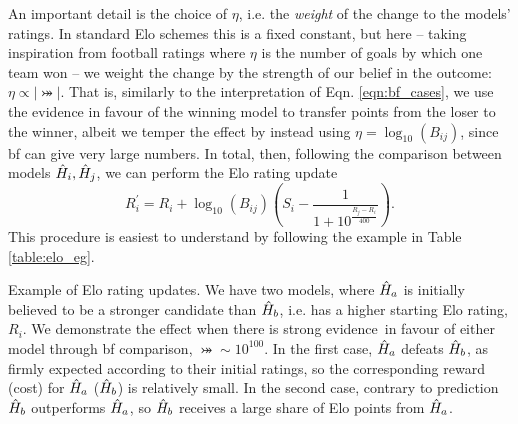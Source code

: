 An important detail is the choice of $\eta$, i.e. the \emph{weight} of the 
    change to the models' ratings. 
In standard Elo schemes this is a fixed constant, 
    but here -- taking inspiration from football ratings where $\eta$ is the number of goals 
    by which one team won -- we weight the change by the strength of our belief in the outcome: 
    $\eta \propto \lvert \bij \rvert$.
That is, similarly to the interpretation of Eqn. \ref{eqn:bf_cases}, 
    we use the evidence in favour of the winning model to transfer points from the loser to the winner,
    albeit we temper the effect by instead using $\eta = \log_{10}(B_{ij})$, since \gls{bf} can give very large numbers. 
In total, then, following the comparison between models $\hat{H}_i, \hat{H}_j$, we can perform the \gls{Elo rating} update
\begin{equation}
    \label{eqn:elo_update}
    R_i^{\prime} = R_i + \log_{10}(B_{ij}) \left(S_i - \frac{1}{1 + 10^{\frac{R_j - R_i}{400}}}\right).
\end{equation}
This procedure is easiest to understand by following the example in Table \ref{table:elo_eg}. 

\begin{table}
    \centering
    
    \caption[Example of Elo rating updates]{
        Example of \gls{Elo rating} updates. 
        We have two models, where $\hat{H}_a$ is initially believed to be a stronger candidate than $\hat{H}_b$, 
            i.e. has a higher starting \gls{Elo rating}, $R_i$.     
        We demonstrate the effect when there is strong evidence\footnotemark \ in favour of either model through \gls{bf} comparison, $\bij \sim 10^{100}$. 
        In the first case, $\hat{H}_a$ defeats $\hat{H}_b$, as firmly expected according to their initial ratings,
            so the corresponding reward (cost) for $\hat{H}_a$ ($\hat{H}_b$) is relatively small.
        In the second case, contrary to prediction $\hat{H}_b$ outperforms $\hat{H}_a$, 
            so $\hat{H}_b$ receives a large share of Elo points from $\hat{H}_a$. 
    }
    \label{table:elo_eg}
\end{table}


